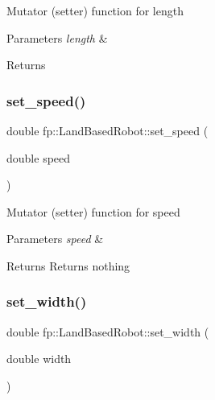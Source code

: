 Mutator (setter) function for length 
\begin{DoxyParams}{Parameters}
{\em length} & \\
\hline
\end{DoxyParams}
\begin{DoxyReturn}{Returns}

\end{DoxyReturn}
\mbox{\label{classfp_1_1_land_based_robot_abddbc887170ed70d2c719cfdf9fed0b7}} 
\subsubsection{\texorpdfstring{set\+\_\+speed()}{set\_speed()}}
{\footnotesize\ttfamily double fp\+::\+Land\+Based\+Robot\+::set\+\_\+speed (\begin{DoxyParamCaption}\item[{double}]{speed }\end{DoxyParamCaption})\hspace{0.3cm}{\ttfamily [inline]}}

Mutator (setter) function for speed 
\begin{DoxyParams}{Parameters}
{\em speed} & \\
\hline
\end{DoxyParams}
\begin{DoxyReturn}{Returns}
Returns nothing 
\end{DoxyReturn}
\mbox{\label{classfp_1_1_land_based_robot_a04fccce1e72832a761b39889b8598c63}} 
\subsubsection{\texorpdfstring{set\+\_\+width()}{set\_width()}}
{\footnotesize\ttfamily double fp\+::\+Land\+Based\+Robot\+::set\+\_\+width (\begin{DoxyParamCaption}\item[{double}]{width }\end{DoxyParamCaption})\hspace{0.3cm}{\ttfamily [inline]}}

